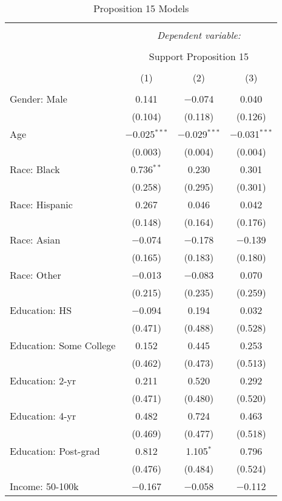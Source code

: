 
\begin{table}[!htbp] \centering 
  \caption{Proposition 15 Models} 
  \label{} 
\footnotesize 
\begin{tabular}{@{\extracolsep{5pt}}lccc} 
\\[-1.8ex]\hline 
\hline \\[-1.8ex] 
 & \multicolumn{3}{c}{\textit{Dependent variable:}} \\ 
\cline{2-4} 
\\[-1.8ex] & \multicolumn{3}{c}{Support Proposition 15} \\ 
\\[-1.8ex] & (1) & (2) & (3)\\ 
\hline \\[-1.8ex] 
 Gender: Male & 0.141 & $-$0.074 & 0.040 \\ 
  & (0.104) & (0.118) & (0.126) \\ 
  Age & $-$0.025$^{***}$ & $-$0.029$^{***}$ & $-$0.031$^{***}$ \\ 
  & (0.003) & (0.004) & (0.004) \\ 
  Race: Black & 0.736$^{**}$ & 0.230 & 0.301 \\ 
  & (0.258) & (0.295) & (0.301) \\ 
  Race: Hispanic & 0.267 & 0.046 & 0.042 \\ 
  & (0.148) & (0.164) & (0.176) \\ 
  Race: Asian & $-$0.074 & $-$0.178 & $-$0.139 \\ 
  & (0.165) & (0.183) & (0.180) \\ 
  Race: Other & $-$0.013 & $-$0.083 & 0.070 \\ 
  & (0.215) & (0.235) & (0.259) \\ 
  Education: HS & $-$0.094 & 0.194 & 0.032 \\ 
  & (0.471) & (0.488) & (0.528) \\ 
  Education: Some College & 0.152 & 0.445 & 0.253 \\ 
  & (0.462) & (0.473) & (0.513) \\ 
  Education: 2-yr & 0.211 & 0.520 & 0.292 \\ 
  & (0.471) & (0.480) & (0.520) \\ 
  Education: 4-yr & 0.482 & 0.724 & 0.463 \\ 
  & (0.469) & (0.477) & (0.518) \\ 
  Education: Post-grad & 0.812 & 1.105$^{*}$ & 0.796 \\ 
  & (0.476) & (0.484) & (0.524) \\ 
  Income: 50-100k & $-$0.167 & $-$0.058 & $-$0.112 \\ 

\end{tabular}
\end{table}
